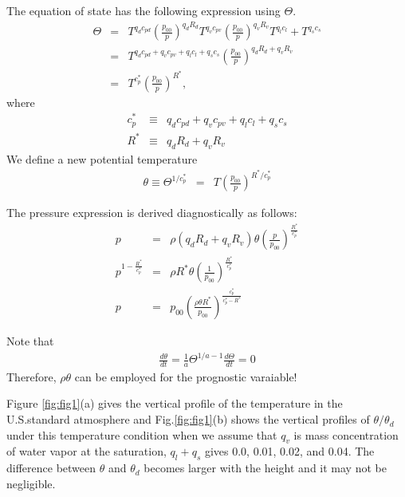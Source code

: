 The equation of state has the following expression using $\Theta$.
\begin{eqnarray}
\Theta &=&
T^{q_d c_{pd}} \left(\frac{p_{00}}{p}\right)^{q_d R_d}
T^{q_v c_{pv}} \left(\frac{p_{00}}{p}\right)^{q_v R_v}
T^{q_l c_l}  + T^{q_s c_s} \\
&=&
T^{q_d c_{pd} +q_vc_{pv}+q_lc_l+q_sc_s}
\left(\frac{p_{00}}{p}\right)^{q_d R_d + q_v R_v} \\
&=&
T^{c_p^*}\left(\frac{p_{00}}{p}\right)^{R^*},
\end{eqnarray}
where
\begin{eqnarray}
  c_p^* &\equiv& q_d c_{pd} +q_vc_{pv}+q_lc_l+q_sc_s\\
  R^* &\equiv& q_d R_d + q_v R_v
\end{eqnarray}
We define a new potential temperature
\begin{eqnarray}
\theta \equiv \Theta^{1/c_p^*} &=& T \left(\frac{p_{00}}{p}\right)^{R^*/c_p^*}
\end{eqnarray}

The pressure expression is derived diagnostically as follows:
\begin{eqnarray}
p&=&\rho (q_d R_d + q_v R_v) \theta \left(\frac{p}{p_{00}}\right)^{\frac{R^*}{c_{p}^*}}\\
p^{1-\frac{R^*}{c_{p}^*}}&=&\rho R^* \theta \left(\frac{1}{p_{00}}\right)^{\frac{R^*}{c_{p}^*}}\\
p&=&p_{00}\left(\frac{\rho \theta R^*}{p_{00}} \right)^{\frac{c_{p}^*}{c_{p}^*- R^*}} \label{eq: pressure}
\end{eqnarray}

Note that
\begin{eqnarray}
  \frac{d \theta}{dt} = \frac{1}{a} \Theta^{1/a-1} \frac{d \Theta}{dt} = 0
  \label{eq:theta_theta_relation}
\end{eqnarray}
Therefore, $\rho \theta$ can be employed for the prognostic varaiable!

Figure \ref{fig:fig1}(a) gives the vertical profile of the temperature
in the U.S.standard atmosphere and Fig.\ref{fig:fig1}(b) shows
the vertical profiles of $\theta/\theta_d$ under this temperature condition
when we assume that $q_v$ is mass concentration of water vapor at the saturation,
$q_l+q_s$ gives 0.0, 0.01, 0.02, and 0.04.
The difference between $\theta$ and $\theta_d$ becomes
larger with the height and it may not be negligible.

